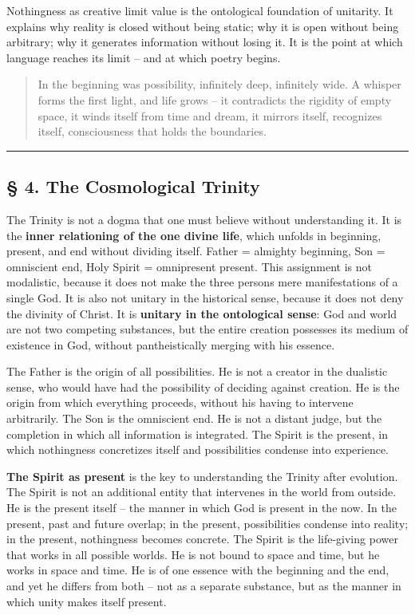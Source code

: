 \documentclass[
  english,
]{article}
\begin{document}
Nothingness as creative limit value is the ontological foundation of
unitarity. It explains why reality is closed without being static; why
it is open without being arbitrary; why it generates information without
losing it. It is the point at which language reaches its limit -- and at
which poetry begins.

\begin{quote}
In the beginning was possibility, infinitely deep, infinitely wide. A
whisper forms the first light, and life grows -- it contradicts the
rigidity of empty space, it winds itself from time and dream, it mirrors
itself, recognizes itself, consciousness that holds the boundaries.
\end{quote}

\begin{center}\rule{0.5\linewidth}{0.5pt}\end{center}

\subsection{§ 4. The Cosmological
Trinity}\label{the-cosmological-trinity}

The Trinity is not a dogma that one must believe without understanding
it. It is the \textbf{inner relationing of the one divine life}, which
unfolds in beginning, present, and end without dividing itself. Father =
almighty beginning, Son = omniscient end, Holy Spirit = omnipresent
present. This assignment is not modalistic, because it does not make the
three persons mere manifestations of a single God. It is also not
unitary in the historical sense, because it does not deny the divinity
of Christ. It is \textbf{unitary in the ontological sense}: God and
world are not two competing substances, but the entire creation
possesses its medium of existence in God, without pantheistically
merging with his essence.

The Father is the origin of all possibilities. He is not a creator in
the dualistic sense, who would have had the possibility of deciding
against creation. He is the origin from which everything proceeds,
without his having to intervene arbitrarily. The Son is the omniscient
end. He is not a distant judge, but the completion in which all
information is integrated. The Spirit is the present, in which
nothingness concretizes itself and possibilities condense into
experience.

\textbf{The Spirit as present} is the key to understanding the Trinity
after evolution. The Spirit is not an additional entity that intervenes
in the world from outside. He is the present itself -- the manner in
which God is present in the now. In the present, past and future
overlap; in the present, possibilities condense into reality; in the
present, nothingness becomes concrete. The Spirit is the life-giving
power that works in all possible worlds. He is not bound to space and
time, but he works in space and time. He is of one essence with the
beginning and the end, and yet he differs from both -- not as a separate
substance, but as the manner in which unity makes itself present.
\end{document}
